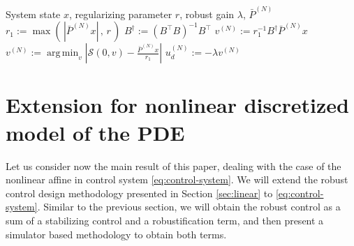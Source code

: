 \documentclass[10pt,a4paper]{amsart}
\newcommand{\tp}{^\top}
\newcommand{\inv}{^{-1}}
\newcommand{\R}{\mathbb{R}}
\renewcommand{\S}{\mathcal{S}}
\newcommand{\simulator}{\S}
\DeclareMathOperator*{\argmin}{arg\,min}
\newcommand{\todo}[1]{{\color{blue} #1}}
\newcommand{\cb}{\color{blue}}
\begin{document}
\begin{algorithm}
\begin{algorithmic}[1]
\Input System state $x$, regularizing parameter $r$, robust gain $\lambda$, $\bar{P}^{(N)}$
\State $r_1 := \max( \, |\bar{P}^{(N)}x| \, , \, r \, ) $
\State $B^{\dagger} := (B\tp B)\inv B\tp$
\State $v^{(N)} := r_1\inv B^{\dagger} \bar{P}^{(N)}x$
\State $v^{(N)} := \argmin_{v} | \simulator(0,v) - \frac{\bar{P}^{(N)}x}{r_1} |$
\EndIf
\State \Return $u^{(N)}_d := -\lambda v^{(N)}$
\end{algorithmic}
\caption{Algorithm to find $u_d$}
\label{alg:ud}
\end{algorithm}




\section{Extension for nonlinear discretized model of the PDE}
\label{sec:nonlinear}

Let us consider now the main result of this paper, dealing with the case of the nonlinear affine in control system \eqref{eq:control-system}. We will extend the robust control design methodology presented in Section \ref{sec:linear} to \eqref{eq:control-system}. Similar to the previous section, we will obtain the robust control as a sum of a stabilizing control and a robustification term, and then present a simulator based methodology to obtain both terms. 
\end{document}

